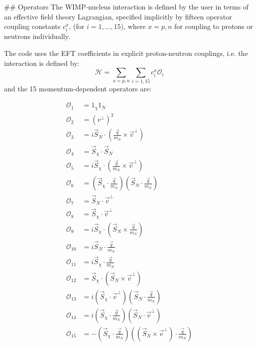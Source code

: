 ## Operators
The WIMP-nucleus interaction is defined by the user in terms of an effective
field theory Lagrangian, specified implicitly by fifteen operator coupling
constants $c_i^x$, (for $i=1,...,15$), where $x=p, n$ for coupling to protons or
neutrons individually.

The code uses the EFT coefficients in explicit proton-neutron couplings, i.e.
the interaction is defined by:
\begin{equation}
    \mathcal{H} = \sum_{x=p,n}\sum_{i=1,15} c^x_i \mathcal{O} _i
\end{equation}
and the 15 momentum-dependent operators are:

\begin{align}
    \mathcal{O} _1 &= 1_\chi 1_N\\
    \mathcal{O} _2 &= (v^\perp)^2\\
    \mathcal{O} _3 &= i\vec{S}_N \cdot \left(\frac{\vec{q}}{m_N}\times
        \vec{v}^\perp\right)\\
    \mathcal{O} _4 &= \vec{S}_\chi \cdot \vec{S}_N\\
    \mathcal{O} _5 &= i\vec{S}_\chi \cdot \left(\frac{\vec{q}}{m_N}\times
        \vec{v}^\perp\right)\\
    \mathcal{O} _6 &= \left(\vec{S}_\chi \cdot \frac{\vec{q}}{m_N} \right)
        \left(\vec{S}_N \cdot \frac{\vec{q}}{m_N} \right) \\
    \mathcal{O} _7 &= \vec{S}_N\cdot \vec{v}^\perp \\
    \mathcal{O} _8 &= \vec{S}_\chi\cdot \vec{v}^\perp \\
    \mathcal{O} _9 &= i\vec{S}_\chi \cdot \left(\vec{S}_N \times
        \frac{\vec{q}}{m_N}\right)\\
    \mathcal{O} _{10} &= i\vec{S}_N \cdot \frac{\vec{q}}{m_N}\\
    \mathcal{O} _{11} &= i\vec{S}_\chi \cdot \frac{\vec{q}}{m_N}\\
    \mathcal{O} _{12} &= \vec{S}_\chi \cdot \left( \vec{S}_N\times
        \vec{v}^\perp\right)\\
    \mathcal{O} _{13} &= i\left( \vec{S}_\chi \cdot \vec{v}^\perp \right)
        \left(\vec{S}_N\cdot \frac{\vec{q}}{m_N}\right )\\
    \mathcal{O} _{14} &= i\left( \vec{S}_\chi \cdot \frac{\vec{q}}{m_N} \right)
        \left(\vec{S}_N\cdot \vec{v}^\perp \right )\\
    \mathcal{O} _{15} &= -\left(\vec{S}_\chi \cdot \frac{\vec{q}}{m_N} \right )
        \left( \left( \vec{S}_N\times \vec{v}^\perp\right)\cdot
        \frac{\vec{q}}{m_N} \right)
\end{align}

